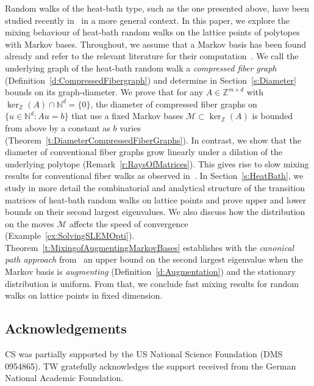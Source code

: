 \documentclass[11pt]{amsart}
\theoremstyle{definition}
\numberwithin{equation}{section}
\newcommand{\ring}[1]{\ensuremath{\mathbb{#1}}}
\renewcommand{\>}{\rangle}
\newcommand{\<}{\langle}
\newcommand{\0}{\mathbf{0}}
\newcommand{\1}{\mathbf{1}}
\newcommand{\2}{\mathbf{2}}
\newcommand\NN{\ring{N}}
\newcommand\ZZ{\ring{Z}}
\newcommand\cM{{\mathcal M}}
\begin{document}
Random walks of the heat-bath type, such as the one presented above, have been
studied recently in~\cite{Dyer2014} in a more general context. In this
paper, we explore the mixing behaviour of heat-bath random walks on
the lattice points of polytopes with Markov bases. Throughout, we
assume that a Markov basis has been found already and refer to the
relevant literature for their
computation~\cite{Sturmfels1996,sullivant2003,hemmecke2005,malkin2007,hara2010,Rauh2014}.
We call the underlying graph of the heat-bath
random walk a \emph{compressed fiber graph}
(Definition~\ref{d:CompressedFibergraph}) and determine in
Section~\ref{s:Diameter} bounds on its graph-diameter. We prove that 
for any $A\in\ZZ^{m\times d}$ with $\ker_\ZZ(A)\cap\NN^d=\{0\}$, the
diameter of compressed fiber graphs on $\{u\in\NN^d:
Au=b\}$ that use a fixed Markov bases
$\cM\subset\ker_\ZZ(A)$ is bounded from above by a constant as $b$ varies
(Theorem~\ref{t:DiameterCompressedFiberGraphs}). In contrast, we 
show that the diameter of conventional fiber graphs grow linearly
under a dilation of the underlying polytope
(Remark~\ref{r:RaysOfMatrices}). This gives
rise to slow mixing results for conventional fiber walks as observed
in~\cite{windisch2015-mixing}.
%
In Section~\ref{s:HeatBath}, we study in more detail the combinatorial
and analytical structure of the transition matrices of heat-bath random
walks on lattice points and prove upper and lower bounds on their
second largest eigenvalues. We also discuss how the distribution on
the moves $\cM$ affects the speed of convergence
(Example~\ref{ex:SolvingSLEMOpti}).
Theorem~\ref{t:MixingofAugmentingMarkovBases} establishes with
the \emph{canonical path approach} from~\cite{Sinclair1992} an upper
bound on the second largest eigenvalue when the Markov basis is
\emph{augmenting} (Definition~\ref{d:Augmentation}) and the stationary
distribution is uniform. From that, we conclude fast mixing
results for random walks on lattice points in fixed dimension.

\subsection*{Acknowledgements}
CS was partially supported by the US National Science Foundation (DMS
0954865).  TW gratefully acknowledges the support received from the
German National Academic Foundation. 
\end{document}

